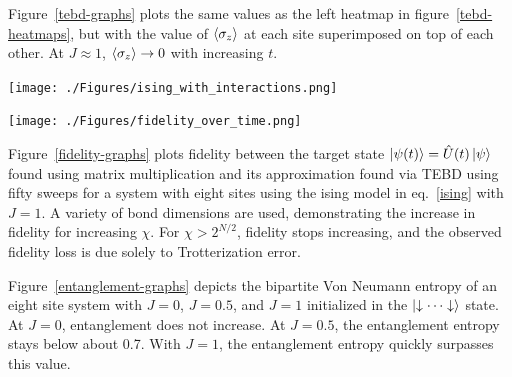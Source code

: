 \documentclass[12pt]{article}
\newenvironment{Figure}
  {\par\medskip\noindent\minipage{\linewidth}}
  {\endminipage\par\medskip}
\begin{document}
\begin{multicols}{2}
	Figure~\ref{tebd-graphs} plots the same values as the left heatmap in figure~\ref{tebd-heatmaps}, but with the value of $\braket{\sigma_z}$ at each site superimposed on top of each other. At $J\approx1$, $\braket{\sigma_z}\rightarrow 0$ with increasing $t$.

	\begin{Figure}
		\center\texttt{[image: ./Figures/ising\_with\_interactions.png]}
		\label{tebd-graphs}
	\end{Figure}

	\begin{Figure}
		\center\texttt{[image: ./Figures/fidelity\_over\_time.png]}
		\label{fidelity-graphs}
	\end{Figure}

	Figure~\ref{fidelity-graphs} plots fidelity between the target state $\ket{\psi(t)}=\hat{U}(t)\ket{\psi}$ found using matrix multiplication and its approximation found via TEBD using fifty sweeps for a system with eight sites using the ising model in eq.~\ref{ising} with $J=1$. A variety of bond dimensions are used, demonstrating the increase in fidelity for increasing $\chi$. For $\chi>2^{N/2}$, fidelity stops increasing, and the observed fidelity loss is due solely to Trotterization error.

	Figure~\ref{entanglement-graphs} depicts the bipartite Von Neumann entropy of an eight site system with $J=0$, $J=0.5$, and $J=1$ initialized in the $\ket{\downarrow\cdots\downarrow}$ state. At $J=0$, entanglement does not increase. At $J=0.5$, the entanglement entropy stays below about 0.7. With $J=1$, the entanglement entropy quickly surpasses this value.


\end{multicols}
\end{document}
